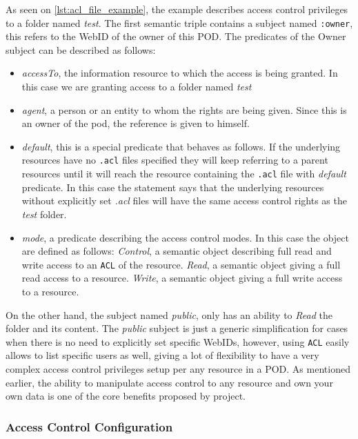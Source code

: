As seen on \autoref{lst:acl_file_example}, the example describes access control privileges to a folder named \textit{test}. The first semantic triple contains a subject named \texttt{:owner}, this refers to the WebID of the owner of this \solid{} POD. The predicates of the Owner subject can be described as follows:
\begin{itemize}
	\item \textit{accessTo}, the information resource to which the access is being granted. In this case we are granting access to a folder named \textit{test}
	\item \textit{agent}, a person or an entity to whom the rights are being given. Since this is an owner of the \solid{} pod, the reference is given to himself.
	\item \textit{default}, this is a special predicate that behaves as follows. If the underlying resources have no \texttt{.acl} files specified they will keep referring to a parent resources until it will reach the resource containing the \texttt{.acl} file with \textit{default} predicate. In this case the statement says that the underlying resources without explicitly set \textit{.acl} files will have the same access control rights as the \textit{test} folder.
	\item \textit{mode}, a predicate describing the access control modes. In this case the object are defined as follows: 
		\subitem \textit{Control}, a semantic object describing full read and write access to an \texttt{ACL} of the resource.
		\subitem \textit{Read}, a semantic object giving a full read access to a resource.
		\subitem \textit{Write}, a semantic object giving a full write access to a resource.
\end{itemize}

On the other hand, the subject named \textit{public}, only has an ability to \textit{Read} the folder and its content. The \textit{public} subject is just a generic simplification for cases when there is no need to explicitly set specific WebIDs, however, using \texttt{ACL} easily allows to list specific users as well, giving a lot of flexibility to have a very complex access control privileges setup per any resource in a \solid{} POD. As mentioned earlier, the ability to manipulate access control to any resource and own your own data is one of the core benefits proposed by \solid{} project. 

\subsubsection{Access Control Configuration}

